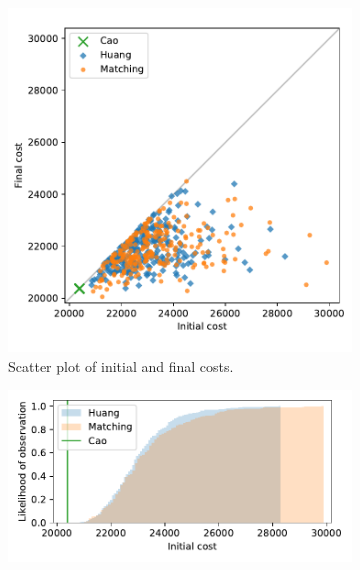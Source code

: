 \documentclass[smallextended]{svjour3}
\begin{document}
\begin{figure}
    \begin{subfigure}{.5\textwidth}
        \includegraphics[width=\linewidth]{Fig2a.pdf}
        \caption{Scatter plot of initial and final costs.}
    \end{subfigure}
    \hfill%
    \begin{subfigure}{.5\textwidth}
        \includegraphics[width=\linewidth]{Fig2b1.pdf}


\end{subfigure}
\end{figure}
\end{document}
